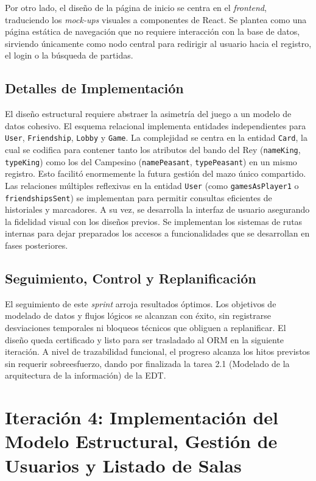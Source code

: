 Por otro lado, el diseño de la página de inicio se centra en el \textit{frontend}, traduciendo los \textit{mock-ups} visuales a componentes de React. Se plantea como una página estática de navegación que no requiere interacción con la base de datos, sirviendo únicamente como nodo central para redirigir al usuario hacia el registro, el login o la búsqueda de partidas.

\section{Detalles de Implementación}
El diseño estructural requiere abstraer la asimetría del juego a un modelo de datos cohesivo. El esquema relacional implementa entidades independientes para \texttt{User}, \texttt{Friendship}, \texttt{Lobby} y \texttt{Game}. La complejidad se centra en la entidad \texttt{Card}, la cual se codifica para contener tanto los atributos del bando del Rey (\texttt{nameKing}, \texttt{typeKing}) como los del Campesino (\texttt{namePeasant}, \texttt{typePeasant}) en un mismo registro. Esto facilitó enormemente la futura gestión del mazo único compartido. Las relaciones múltiples reflexivas en la entidad \texttt{User} (como \texttt{gamesAsPlayer1} o \texttt{friendshipsSent}) se implementan para permitir consultas eficientes de historiales y marcadores.
A su vez, se desarrolla la interfaz de usuario asegurando la fidelidad visual con los diseños previos. Se implementan los sistemas de rutas internas para dejar preparados los accesos a funcionalidades que se desarrollan en fases posteriores.

\section{Seguimiento, Control y Replanificación}
El seguimiento de este \textit{sprint} arroja resultados óptimos. Los objetivos de modelado de datos y flujos lógicos se alcanzan con éxito, sin registrarse desviaciones temporales ni bloqueos técnicos que obliguen a replanificar. El diseño queda certificado y listo para ser trasladado al ORM en la siguiente iteración. A nivel de trazabilidad funcional, el progreso alcanza los hitos previstos sin requerir sobreesfuerzo, dando por finalizada la tarea 2.1 (Modelado de la arquitectura de la información) de la EDT.


\chapter[Iteración 4: Modelo Estructural y Gestión de Usuarios]{Iteración 4: Implementación del Modelo Estructural, Gestión de Usuarios y Listado de Salas}

